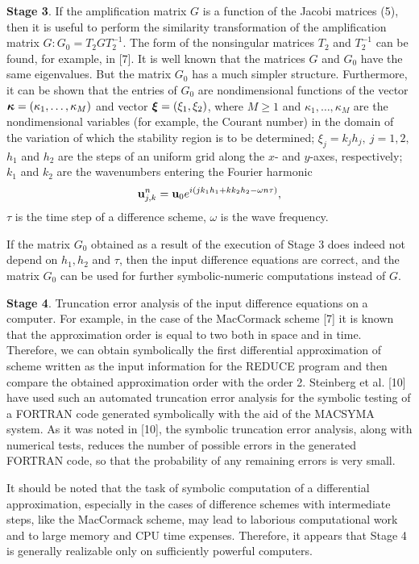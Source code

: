 {\bf Stage 3}. If the amplification matrix $G$ is a function of the Jacobi
matrices (5), then it is useful to perform the
similarity transformation of the amplification matrix
$G: G_0 = T_2 G T_2 ^{-1}$. The form of the nonsingular matrices $T_2$ and
$T_2^{-1}$ can be found, for example, in [7].
It is well known that the matrices $G$ and $G_0 $ have the same eigenvalues.
But the matrix $G_0$ has a much simpler structure. Furthermore, it can be shown
that the entries of $G_0 $ are nondimensional functions of the vector
$\mbox{\boldmath $\kappa$\unboldmath}=(\kappa_1,\ldots,\kappa_M)$ and vector
$\mbox{\boldmath $\xi$\unboldmath}=(\xi_1,\xi_2)$, where $M\geq 1$ and
$\kappa_1,\ldots,\kappa_M$ are the nondimensional variables (for example, the
Courant number) in the domain of the variation of which the stability region is
to be determined; $\xi_j=k_jh_j,~j=1,2,$ $h_1$ and $h_2$ are the steps of an
uniform grid along the $x$- and $y$-axes, respectively; $k_1$ and $k_2$ are
the wavenumbers entering the Fourier harmonic
\begin{equation}
{\bf u}_{j,k}^n={\bf u}_0e^{i(jk_1h_1+kk_2h_2-\omega n\tau)},
\end{equation}
$\tau$ is the time step of a difference scheme, $\omega$ is the wave frequency.

   If the matrix $G_0$ obtained as a result of the execution of Stage 3 does
indeed not depend on $h_1,h_2$ and $\tau$, then the input difference equations
are correct, and the matrix $G_0$ can be used for further symbolic-numeric
computations instead of $G$.

{\bf Stage 4}. Truncation error analysis of the input difference equations on
a computer. For example, in the case of the MacCormack scheme [7] it is known
that the approximation order is equal to two both in space and in time.
Therefore, we can obtain symbolically the first differential approximation of
scheme written as the input information for the REDUCE program and then compare the
obtained approximation order with the order 2. Steinberg et al. [10] have
used such an automated truncation error analysis for the symbolic testing of
a FORTRAN code generated symbolically with the aid of the MACSYMA system.
As it was noted in [10], the symbolic truncation error analysis, along with
numerical tests, reduces the number of possible errors in the generated FORTRAN
code, so that the probability of any remaining errors is very small.

   It should be noted that the task of symbolic computation of a differential
approximation, especially in the cases of difference schemes with intermediate
steps, like the MacCormack scheme, may lead to laborious  computational work
and to large memory and CPU time expenses. Therefore, it appears that Stage 4
is generally realizable only on sufficiently powerful computers.

